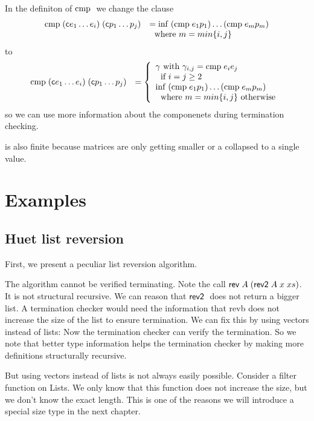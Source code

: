 In the definiton of $\mathrm{cmp}\;$ we change the clause 
\[
\begin{array}[t]{ll}
\mathrm{cmp}\; (\mathsf{c} e_1 \ldots e_i) \; (\mathsf{c} p_1 \ldots p_j ) & = \mathrm{inf}\; (\mathrm{cmp}\; e_1 p_1) \ldots (\mathrm{cmp}\; e_m p_m)\\
& \; \mbox { where } m = min\{i,j\}\\ 
\end{array}
\]
to
\[
\begin{array}[t]{ll}
\mathrm{cmp}\; (\mathsf{c} e_1 \ldots e_i) \; (\mathsf{c} p_1 \ldots p_j ) & = 
\left\{\begin{array}{l} \gamma \mbox{ with } \gamma_{i,j} = \mathrm{cmp}\; e_i e_j \\
\; \mbox{ if } i = j \geq 2 \\
\mathrm{inf}\; (\mathrm{cmp}\; e_1 p_1) \ldots (\mathrm{cmp}\; e_m p_m)\\
\; \mbox { where } m = min\{i,j\} \mbox{ otherwise } 
\end{array}
\right.
\end{array}
\]
so we can use more information about the componenets during termination checking.

\begin{definition}
is also finite because matrices are only getting smaller or a collapsed to a single value.
\end{definition}

\section{Examples}


\subsection{Huet list reversion}
First, we present a peculiar list reversion algorithm.

The algorithm cannot be verified terminating.
Note the call $\mathsf{rev}\; A \; (\mathsf{rev2}\; A \; x \; xs)$.
It is not structural recursive.
We can reason that $\mathsf{rev2}\;$ does not return a bigger list.  
A termination checker would need the information that revb does not increase the size of the list to ensure termination.
We can fix this by using vectors instead of lists:
Now the termination checker can verify the termination.
So we note that better type information helps the termination checker by making more definitions structurally recursive.

But using vectors instead of lists is not always easily possible.
Consider a filter function on Lists. We only know that this function does not increase the size, but
we don't know the exact length.
This is one of the reasons we will introduce a special size type in the next chapter.

